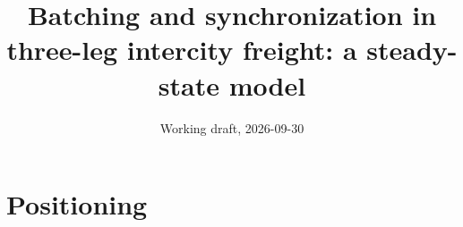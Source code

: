 \documentclass[10pt, reqno]{amsart}
\theoremstyle{definition}
\begin{document}
\title{Batching and synchronization in three-leg intercity freight: a steady-state model}
\author{Working draft, 2026-09-30}
\maketitle

%
%

\section{Positioning}
\end{document}

